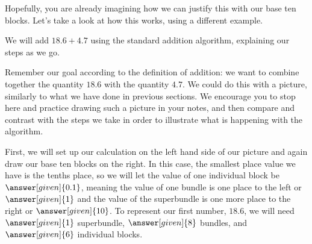 \documentclass{ximera}
\begin{document}
Hopefully, you are already imagining how we can justify this with our base ten blocks. Let's take a look at how this works, using a different example.


\begin{example}
We will add $18.6 + 4.7$ using the standard addition algorithm, explaining our steps as we go.

Remember our goal according to the definition of addition: we want to combine together the quantity $18.6$ with the quantity $4.7$. We could do this with a picture, similarly to what we have done in previous sections. We encourage you to stop here and practice drawing such a picture in your notes, and then compare and contrast with the steps we take in order to illustrate what is happening with the algorithm.

First, we will set up our calculation on the left hand side of our picture and again draw our base ten blocks on the right. In this case, the smallest place value we have is the tenths place, so we will let the value of one individual block be $\answer[given]{0.1}$, meaning the value of one bundle is one place to the left or $\answer[given]{1}$ and the value of the superbundle is one more place to the right or $\answer[given]{10}$. To represent our first number, $18.6$, we will need $\answer[given]{1}$ superbundle, $\answer[given]{8}$ bundles, and $\answer[given]{6}$ individual blocks.

\begin{image}
\end{image}
\end{example}
\end{document}
